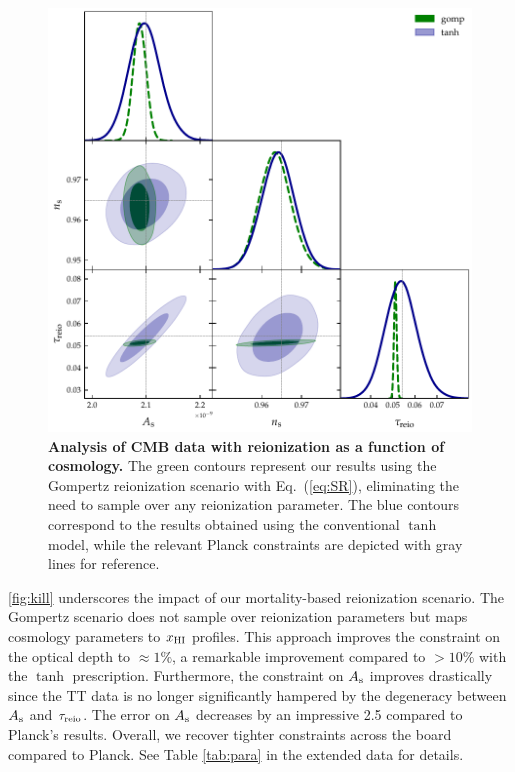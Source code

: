\begin{figure}
\centering
\includegraphics[width=\linewidth]{figs/gomp_tanh_triangle_kill.pdf}
\caption{\textbf{Analysis of CMB data with reionization as a function of
cosmology.}
The green contours represent our results using the Gompertz reionization
scenario with Eq.~(\ref{eq:SR}), eliminating the need to sample over any
reionization parameter.
The blue contours correspond to the results obtained using the
conventional $\tanh$ model, while the relevant Planck constraints
\cite{Planck2020a} are depicted with gray lines for reference.}
\label{fig:kill}
\end{figure}

\autoref{fig:kill} underscores the impact of our mortality-based
reionization scenario.
The Gompertz scenario does not sample over reionization parameters but
maps cosmology parameters to $x_{\mathrm{HI}}$ profiles.
This approach improves the constraint on the optical depth to $\approx
1\%$, a remarkable improvement compared to $> 10\%$ with the $\tanh$
prescription.
Furthermore, the constraint on $A_\mathrm{s}$ improves drastically since the TT
data is no longer significantly hampered by the degeneracy between $A_\mathrm{s}$
and $\tau_{\mathrm{reio}}$.
The error on $A_\mathrm{s}$ decreases by an impressive 2.5 compared to Planck's
results\cite{Planck2020a}.
Overall, we recover tighter constraints across the board compared to
Planck.
See Table \ref{tab:para} in the extended data for details.


